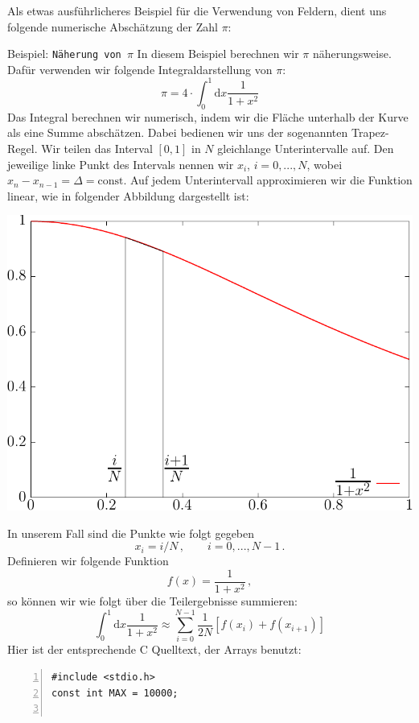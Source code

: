 Als etwas ausführlicheres Beispiel für die Verwendung von Feldern, dient uns folgende numerische Abschätzung der Zahl $\pi$:
\begin{myexampleprogram}{Beispiel: \texttt{Näherung von $\pi$}}
  In diesem Beispiel berechnen wir $\pi$ näherungsweise.
  Dafür verwenden wir folgende Integraldarstellung von $\pi$:
  \begin{equation}
    \pi=4\cdot \int_{0}^{1} \mathrm{d}x \dfrac{1}{1+x^2}
  \end{equation}
  Das Integral berechnen wir numerisch, indem wir die Fläche unterhalb der Kurve als eine Summe abschätzen.
  Dabei bedienen wir uns der sogenannten Trapez-Regel.
  Wir teilen das Interval $[0,1]$ in $N$ gleichlange Unterintervalle auf.
  Den jeweilige linke Punkt des Intervals nennen wir $x_i$, $i=0,...,N$, wobei $x_n-x_{n-1}=\Delta=\mathrm{const}$.
  Auf jedem Unterintervall approximieren wir die Funktion linear, wie in folgender Abbildung dargestellt ist:
  \begin{center}
    \includegraphics[width=.6\linewidth]{trapez1}
  \end{center}
  In unserem Fall sind die Punkte wie folgt gegeben
  \begin{displaymath}
    x_i = i/N\,,\qquad i = 0, ..., N-1\,.
  \end{displaymath}
  Definieren wir folgende Funktion
  \[
  f(x) = \frac{1}{1+x^2}\,,
  \]
  so können wir wie folgt über die Teilergebnisse summieren:
  \begin{equation}
    \int_{0}^{1} \mathrm{d}x \dfrac{1}{1+x^2}\approx \sum_{i=0}^{N-1}\frac{1}{2N}[f(x_i)+f(x_{i+1})]
  \end{equation}
  Hier ist der entsprechende C Quelltext, der Arrays benutzt:
\begin{lstlisting}[numbers=left]
#include <stdio.h>
const int MAX = 10000;


\end{lstlisting}
\end{myexampleprogram}
